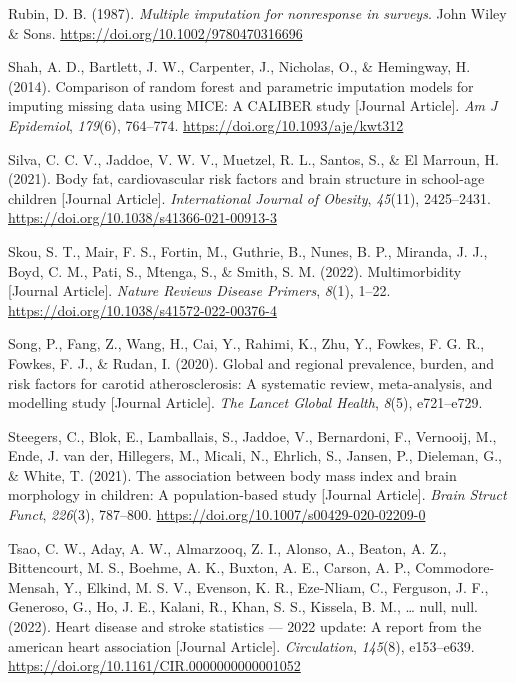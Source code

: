 \documentclass[
  letterpaper,
  DIV=11,
  numbers=noendperiod]{scrreport}
\newlength{\cslhangindent}
\newenvironment{CSLReferences}[2] %
 {\begin{list}{}{%
  \setlength{\itemindent}{0pt}
  \setlength{\leftmargin}{0pt}
  \setlength{\parsep}{0pt}
  \ifodd #1
   \setlength{\leftmargin}{\cslhangindent}
   \setlength{\itemindent}{-1\cslhangindent}
  \fi
  \setlength{\itemsep}{#2\baselineskip}}}
 {\end{list}}
\begin{document}
\begin{CSLReferences}{1}{0}
Rubin, D. B. (1987). \emph{Multiple imputation for nonresponse in
surveys}. John Wiley \& Sons.
\url{https://doi.org/10.1002/9780470316696}

Shah, A. D., Bartlett, J. W., Carpenter, J., Nicholas, O., \& Hemingway,
H. (2014). Comparison of random forest and parametric imputation models
for imputing missing data using MICE: A CALIBER study {[}Journal
Article{]}. \emph{Am J Epidemiol}, \emph{179}(6), 764--774.
\url{https://doi.org/10.1093/aje/kwt312}

Silva, C. C. V., Jaddoe, V. W. V., Muetzel, R. L., Santos, S., \& El
Marroun, H. (2021). Body fat, cardiovascular risk factors and brain
structure in school-age children {[}Journal Article{]}.
\emph{International Journal of Obesity}, \emph{45}(11), 2425--2431.
\url{https://doi.org/10.1038/s41366-021-00913-3}

Skou, S. T., Mair, F. S., Fortin, M., Guthrie, B., Nunes, B. P.,
Miranda, J. J., Boyd, C. M., Pati, S., Mtenga, S., \& Smith, S. M.
(2022). Multimorbidity {[}Journal Article{]}. \emph{Nature Reviews
Disease Primers}, \emph{8}(1), 1--22.
\url{https://doi.org/10.1038/s41572-022-00376-4}

Song, P., Fang, Z., Wang, H., Cai, Y., Rahimi, K., Zhu, Y., Fowkes, F.
G. R., Fowkes, F. J., \& Rudan, I. (2020). Global and regional
prevalence, burden, and risk factors for carotid atherosclerosis: A
systematic review, meta-analysis, and modelling study {[}Journal
Article{]}. \emph{The Lancet Global Health}, \emph{8}(5), e721--e729.

Steegers, C., Blok, E., Lamballais, S., Jaddoe, V., Bernardoni, F.,
Vernooij, M., Ende, J. van der, Hillegers, M., Micali, N., Ehrlich, S.,
Jansen, P., Dieleman, G., \& White, T. (2021). The association between
body mass index and brain morphology in children: A population-based
study {[}Journal Article{]}. \emph{Brain Struct Funct}, \emph{226}(3),
787--800. \url{https://doi.org/10.1007/s00429-020-02209-0}

Tsao, C. W., Aday, A. W., Almarzooq, Z. I., Alonso, A., Beaton, A. Z.,
Bittencourt, M. S., Boehme, A. K., Buxton, A. E., Carson, A. P.,
Commodore-Mensah, Y., Elkind, M. S. V., Evenson, K. R., Eze-Nliam, C.,
Ferguson, J. F., Generoso, G., Ho, J. E., Kalani, R., Khan, S. S.,
Kissela, B. M., \ldots{} null, null. (2022). Heart disease and stroke
statistics --- 2022 update: A report from the american heart association
{[}Journal Article{]}. \emph{Circulation}, \emph{145}(8), e153--e639.
\url{https://doi.org/10.1161/CIR.0000000000001052}


\end{CSLReferences}
\end{document}
